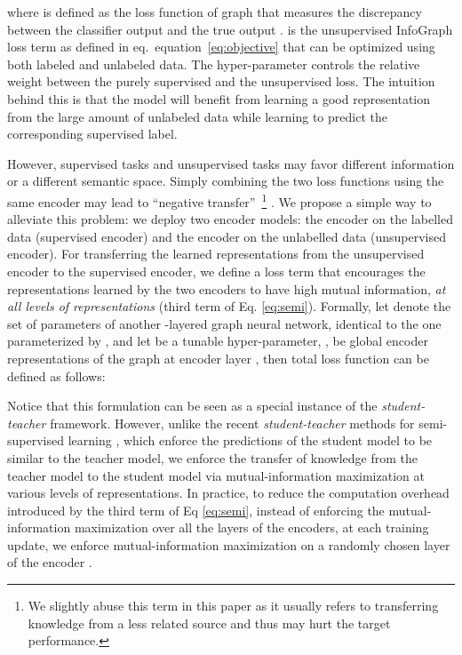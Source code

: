 \documentclass{article} \usepackage{iclr2020_conference,times}
\def\eqref#1{equation~\ref{#1}}
\def\method{InfoGraph}
\begin{document}
where  is defined as the loss function of graph  that measures the discrepancy between the classifier output  and the true output .  is the unsupervised \method{} loss term as defined in eq.~\eqref{eq:objective} that can be optimized using both labeled and unlabeled data. The hyper-parameter  controls the relative weight between the purely supervised and the unsupervised loss. The intuition behind this is that the model will benefit from learning a good representation from the large amount of unlabeled data while learning to predict the corresponding supervised label.



However, supervised tasks and unsupervised tasks may favor different information or a different semantic space. Simply combining the two loss functions using the same encoder may lead to ``negative transfer''~\footnote{We slightly abuse this term in this paper as it usually refers to transferring knowledge from a less related source and thus may hurt the target performance.} \citep{pan2009survey,rosenstein2005transfer}. We propose a simple way to alleviate this problem: we deploy two encoder models: the encoder on the labelled data (supervised encoder) and the encoder on the unlabelled data (unsupervised encoder). For transferring the learned representations from the unsupervised encoder to the supervised encoder, we define a  loss term that encourages the representations learned by the two encoders to have high mutual information, \textit{at all levels of representations} (third term of Eq. \ref{eq:semi}).  Formally, let  denote the set of parameters of another -layered graph neural network, identical to the one parameterized by , and let  be a tunable hyper-parameter, ,  be global encoder representations of the graph  at encoder layer ,  then total loss function can be defined as follows:





Notice that this formulation can be seen as a special instance of the \textit{student-teacher} framework. However, unlike the recent \textit{student-teacher} methods for semi-supervised learning \citep{laine2016temporal,tarvainen2017mean, ict}, which enforce the predictions of the student model to be similar to the teacher model, we enforce the transfer of knowledge from the teacher model to the student model via mutual-information maximization at various levels of representations. In practice, to reduce the computation overhead introduced by the third term of Eq \ref{eq:semi}, instead of enforcing the mutual-information maximization over all the layers of the encoders, at each training update, we enforce mutual-information maximization on a randomly chosen layer of the encoder \citep{manifold_mixup}.
\end{document}
